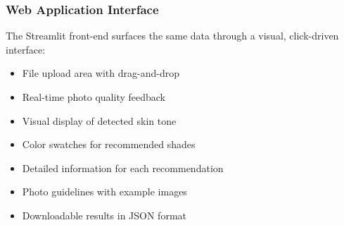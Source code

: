 \subsubsection{Web Application Interface}

The Streamlit front-end surfaces the same data through a visual, click-driven interface:

\begin{itemize}
    \item File upload area with drag-and-drop
    \item Real-time photo quality feedback
    \item Visual display of detected skin tone
    \item Color swatches for recommended shades
    \item Detailed information for each recommendation
    \item Photo guidelines with example images
    \item Downloadable results in JSON format
\end{itemize}

